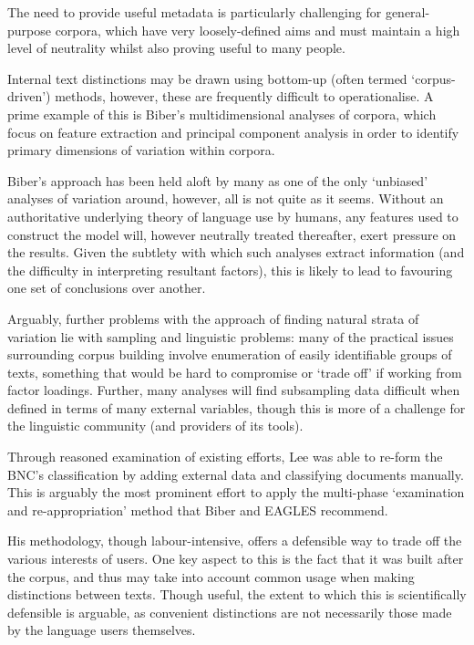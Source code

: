 The need to provide useful metadata is particularly challenging for general-purpose corpora, which have very loosely-defined aims and must maintain a high level of neutrality whilst also proving useful to many people.




Internal text distinctions may be drawn using bottom-up (often termed `corpus-driven') methods, however, these are frequently difficult to operationalise.  A prime example of this is Biber's multidimensional analyses of corpora, which focus on feature extraction and principal component analysis in order to identify primary dimensions of variation within corpora.

Biber's approach has been held aloft by many as one of the only `unbiased' analyses of variation around, however, all is not quite as it seems.  Without an authoritative underlying theory of language use by humans, any features used to construct the model will, however neutrally treated thereafter, exert pressure on the results.  Given the subtlety with which such analyses extract information (and the difficulty in interpreting resultant factors), this is likely to lead to favouring one set of conclusions over another.

Arguably, further problems with the approach of finding natural strata of variation lie with sampling and linguistic problems: many of the practical issues surrounding corpus building involve enumeration of easily identifiable groups of texts, something that would be hard to compromise or `trade off' if working from factor loadings.  Further, many analyses will find subsampling data difficult when defined in terms of many external variables, though this is more of a challenge for the linguistic community (and providers of its tools).


Through reasoned examination of existing efforts, Lee 
was able to re-form the BNC's classification by adding external data and classifying documents manually.  This is arguably the most prominent effort to apply the multi-phase `examination and re-appropriation' method that Biber and EAGLES recommend.


His methodology, though labour-intensive, offers a defensible way to trade off the various interests of users.  One key aspect to this is the fact that it was built after the corpus, and thus may take into account common usage when making distinctions between texts.  Though useful, the extent to which this is scientifically defensible is arguable, as convenient distinctions are not necessarily those made by the language users themselves.


